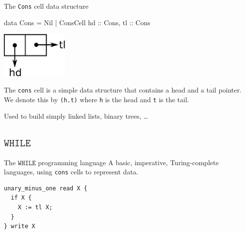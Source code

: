 \documentclass{beamer}
\newcommand*{\WHILE}{\ensuremath{\mathtt{WHILE}}\xspace}
\theoremstyle{definition}
\begin{document}
\begin{frame}[fragile]{The {\tt Cons}\/ cell data structure}
	\begin{center}
		\begin{code}
			data Cons = Nil | ConsCell { hd :: Cons, tl :: Cons }
		\end{code}
		\includegraphics[width=0.25\textwidth]{pictures/conscell}
	\end{center}
	The {\tt cons}\/ cell is a simple data structure that contains a head and a 
	tail pointer. We denote this by {\tt (h.t)}\/ where {\tt h}\/ is the head and 
	{\tt t}\/ is the tail.
	\pause

	Used to build simply linked lists, binary trees, \dots
\end{frame}

\subsection{\WHILE}
\begin{frame}[fragile]{The \WHILE programming language}
	A basic, imperative, Turing-complete languages, using {\tt cons} cells to 
	represent data.
	
	\begin{example}
		\begin{verbatim}
unary_minus_one read X {
  if X {
    X := tl X;
  }
} write X\end{verbatim}
	\end{example}
\end{frame}
\end{document}
